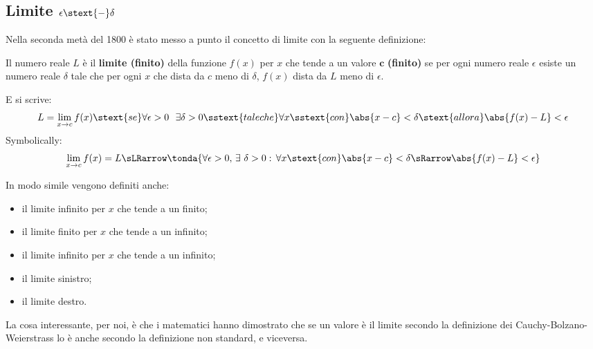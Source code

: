 \subsection{Limite \(\epsilon \stext{-} \delta\)}

Nella seconda metà del 1800 è stato messo a punto il concetto di limite
con la seguente definizione:

\begin{definizione}
Il numero reale \(L\) è il \textbf{limite (finito)} della funzione \(f(x)\) 
per \(x\) che tende a un valore \(\mathbf{c}\) \textbf{(finito)} se per ogni 
numero reale \(\epsilon\) esiste un numero reale \(\delta\) tale che per ogni 
\(x\) 
che dista da \(c\) meno di \(\delta\), \(f(x)\) dista da \(L\) 
meno di \(\epsilon\).

E si scrive:
\[L = \lim_{x \rightarrow c}f(x) \stext{se}
\forall \epsilon > 0 ~~ \exists \delta > 0 
\sstext{tale che} \forall x \sstext{con} \abs{x - c} < \delta
\stext{allora} 
\abs{f(x) - L} < \epsilon\]
Symbolically:
\[\lim_{x \to c} f(x) = L  \sLRarrow  
\tonda{\forall \epsilon > 0,\,
\exists ~ \delta > 0:\,\forall x \stext{con} \abs{x - c} < \delta
\sRarrow \abs{f(x) - L} < \epsilon}\]

\end{definizione}

In modo simile vengono definiti anche:
\begin{itemize}
\item il limite infinito per \(x\) che tende a un finito;
\item il limite finito per \(x\) che tende a un infinito;
\item il limite infinito per \(x\) che tende a un infinito;
\item il limite sinistro;
\item il limite destro.
\end{itemize}

La cosa interessante, per noi, è che i matematici hanno dimostrato che se un 
valore è il limite secondo la definizione dei Cauchy-Bolzano-Weierstrass 
lo è anche secondo la definizione non standard, e viceversa.
